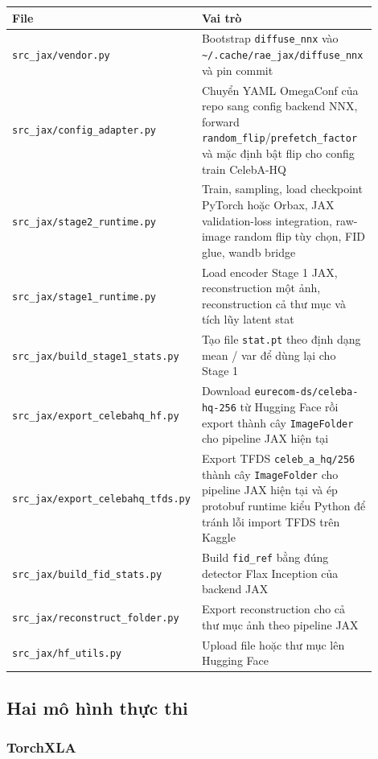 \begin{center}
\begin{longtable}{>{\raggedright\arraybackslash}p{0.28\linewidth} >{\raggedright\arraybackslash}p{0.62\linewidth}}
\toprule
File & Vai trò \\
\midrule
\endhead
\texttt{src\_jax/vendor.py} & Bootstrap \texttt{diffuse\_nnx} vào \texttt{\~{}/.cache/rae\_jax/diffuse\_nnx} và pin commit \\
\texttt{src\_jax/config\_adapter.py} & Chuyển YAML OmegaConf của repo sang config backend NNX, forward \texttt{random\_flip}/\texttt{prefetch\_factor} và mặc định bật flip cho config train CelebA-HQ \\
\texttt{src\_jax/stage2\_runtime.py} & Train, sampling, load checkpoint PyTorch hoặc Orbax, JAX validation-loss integration, raw-image random flip tùy chọn, FID glue, wandb bridge \\
 \texttt{src\_jax/stage1\_runtime.py} & Load encoder Stage 1 JAX, reconstruction một ảnh, reconstruction cả thư mục và tích lũy latent stat \\
 \texttt{src\_jax/build\_stage1\_stats.py} & Tạo file \texttt{stat.pt} theo định dạng mean / var để dùng lại cho Stage 1 \\
 \texttt{src\_jax/export\_celebahq\_hf.py} & Download \texttt{eurecom-ds/celeba-hq-256} từ Hugging Face rồi export thành cây \texttt{ImageFolder} cho pipeline JAX hiện tại \\
 \texttt{src\_jax/export\_celebahq\_tfds.py} & Export TFDS \texttt{celeb\_a\_hq/256} thành cây \texttt{ImageFolder} cho pipeline JAX hiện tại và ép protobuf runtime kiểu Python để tránh lỗi import TFDS trên Kaggle \\
 \texttt{src\_jax/build\_fid\_stats.py} & Build \texttt{fid\_ref} bằng đúng detector Flax Inception của backend JAX \\
 \texttt{src\_jax/reconstruct\_folder.py} & Export reconstruction cho cả thư mục ảnh theo pipeline JAX \\
\texttt{src\_jax/hf\_utils.py} & Upload file hoặc thư mục lên Hugging Face \\
\bottomrule
\end{longtable}
\end{center}

\subsection{Hai mô hình thực thi}

\subsubsection{TorchXLA}

